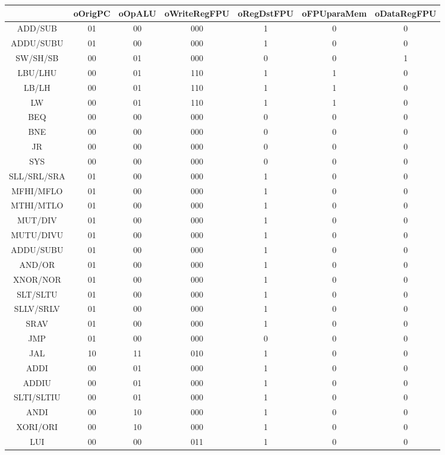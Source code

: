 \documentclass[12pt]{article}
\begin{document}
\begin{longtable}{|c|c|c|c|c|c|c|}
		\hline
		& oOrigPC & oOpALU & oWriteRegFPU & oRegDstFPU & oFPUparaMem & oDataRegFPU\\\hline
		ADD/SUB & 01 & 00 & 000 & 1 & 0 & 0\\\hline	
		ADDU/SUBU & 01 & 00 & 000 & 1 & 0 & 0\\\hline
		SW/SH/SB & 00 & 01 & 000 & 0 & 0 & 1\\\hline
		LBU/LHU & 00 & 01 & 110 & 1 & 1 & 0\\\hline
		LB/LH & 00 & 01 & 110 & 1 & 1 & 0\\\hline
		LW & 00 & 01 & 110 & 1 & 1 & 0\\\hline
		BEQ & 00 & 00 & 000 & 0 & 0 & 0\\\hline	
		BNE & 00 & 00 & 000 & 0 & 0 & 0\\\hline
		JR & 00 & 00 & 000 & 0 & 0 & 0\\\hline
		SYS & 00 & 00 & 000 & 0 & 0 & 0\\\hline
		SLL/SRL/SRA & 01 & 00 & 000 & 1 & 0 & 0\\\hline
		MFHI/MFLO & 01 & 00 & 000 & 1 & 0 & 0\\\hline
		MTHI/MTLO & 01 & 00 & 000 & 1 & 0 & 0\\\hline
		MUT/DIV & 01 & 00 & 000 & 1 & 0 & 0\\\hline
		MUTU/DIVU & 01 & 00 & 000 & 1 & 0 & 0\\\hline
		ADDU/SUBU & 01 & 00 & 000 & 1 & 0 & 0\\\hline
		AND/OR & 01 & 00 & 000 & 1 & 0 & 0\\\hline
		XNOR/NOR & 01 & 00 & 000 & 1 & 0 & 0\\\hline
		SLT/SLTU & 01 & 00 & 000 & 1 & 0 & 0\\\hline
		SLLV/SRLV & 01 & 00 & 000 & 1 & 0 & 0\\\hline
		SRAV & 01 & 00 & 000 & 1 & 0 & 0\\\hline	
		JMP & 01 & 00 & 000 & 0 & 0 & 0\\\hline
		JAL & 10 & 11 & 010 & 1 & 0 & 0\\\hline
		ADDI & 00 & 01 & 000 & 1 & 0 & 0\\\hline
		ADDIU & 00 & 01 & 000 & 1 & 0 & 0\\\hline
		SLTI/SLTIU & 00 & 01 & 000 & 1 & 0 & 0\\\hline
		ANDI & 00 & 10 & 000 & 1 & 0 & 0\\\hline
		XORI/ORI & 00 & 10 & 000 & 1 & 0 & 0\\\hline
		LUI & 00 & 00 & 011 & 1 & 0 & 0\\\hline	

\end{longtable}
\end{document}
